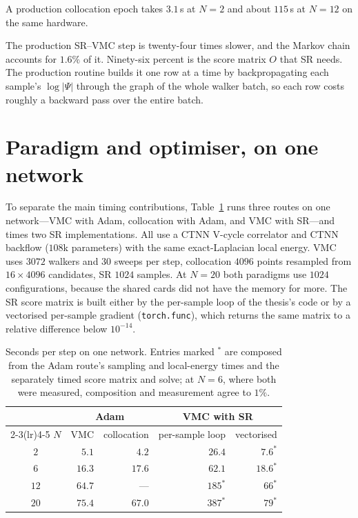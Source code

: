 \noindent A production collocation epoch takes $3.1$\,s at $N{=}2$ and about $115$\,s at
$N{=}12$ on the same hardware.

The production SR--VMC step is twenty-four times slower, and the Markov chain accounts for
$1.6\%$ of it. Ninety-six percent is the score matrix $O$ that SR needs. The production routine
builds it one row at a time by backpropagating each sample's $\log|\Psi|$ through the graph of
the whole walker batch, so each row costs roughly a backward pass over the entire batch.

\section{Paradigm and optimiser, on one network}

To separate the main timing contributions, Table~\ref{tab:walltime-grid} runs three routes
on one network---VMC with Adam, collocation with Adam, and VMC with SR---and times two SR
implementations. All use a CTNN V-cycle correlator and CTNN backflow ($108$k parameters) with
the same exact-Laplacian local energy. VMC uses $3072$ walkers and $30$ sweeps per step,
collocation $4096$ points resampled from $16\times4096$ candidates, SR $1024$ samples. At
$N{=}20$ both paradigms use $1024$ configurations, because the shared cards did not have the
memory for more. The SR score matrix is built either by the per-sample loop of the thesis's
code or by a vectorised per-sample gradient (\texttt{torch.func}), which returns the same matrix
to a relative difference below $10^{-14}$.

\begin{table}[H]
\centering
\caption[Wall time by paradigm and optimiser]{Seconds per step on one network. Entries marked
$^{*}$ are composed from the Adam route's sampling and local-energy times and the separately
timed score matrix and solve; at $N{=}6$, where both were measured, composition and measurement
agree to $1\%$.}
\label{tab:walltime-grid}
\small
\begin{tabular}{c rr rr}
\toprule
 & \multicolumn{2}{c}{Adam} & \multicolumn{2}{c}{VMC with SR} \\
\cmidrule(lr){2-3}\cmidrule(lr){4-5}
$N$ & VMC & collocation & per-sample loop & vectorised \\
\midrule
$2$  & $5.1$  & $4.2$  & $26.4$      & $7.6^{*}$  \\
$6$  & $16.3$ & $17.6$ & $62.1$      & $18.6^{*}$ \\
$12$ & $64.7$ & ---    & $185^{*}$   & $66^{*}$   \\
$20$ & $75.4$ & $67.0$ & $387^{*}$   & $79^{*}$   \\
\bottomrule
\end{tabular}
\end{table}

